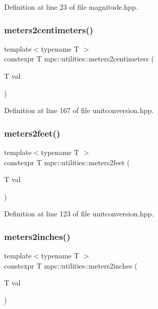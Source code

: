 Definition at line 23 of file magnitude.\+hpp.

\mbox{\label{namespacempc_1_1utilities_a6779c38d6af8d9946e53f061feb8d774}} 
\subsubsection{\texorpdfstring{meters2centimeters()}{meters2centimeters()}}
{\footnotesize\ttfamily template$<$typename T $>$ \\
constexpr T mpc\+::utilities\+::meters2centimeters (\begin{DoxyParamCaption}\item[{T}]{val }\end{DoxyParamCaption})}



Definition at line 167 of file unitconversion.\+hpp.

\mbox{\label{namespacempc_1_1utilities_a7976143deef719413c2ff1447d7fec42}} 
\subsubsection{\texorpdfstring{meters2feet()}{meters2feet()}}
{\footnotesize\ttfamily template$<$typename T $>$ \\
constexpr T mpc\+::utilities\+::meters2feet (\begin{DoxyParamCaption}\item[{T}]{val }\end{DoxyParamCaption})}



Definition at line 123 of file unitconversion.\+hpp.

\mbox{\label{namespacempc_1_1utilities_aa0b241eebaf3058ec563fd6be9c00009}} 
\subsubsection{\texorpdfstring{meters2inches()}{meters2inches()}}
{\footnotesize\ttfamily template$<$typename T $>$ \\
constexpr T mpc\+::utilities\+::meters2inches (\begin{DoxyParamCaption}\item[{T}]{val }\end{DoxyParamCaption})}



